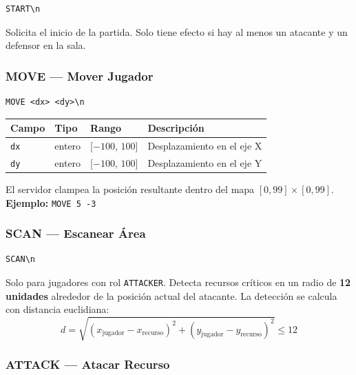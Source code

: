 \documentclass[12pt, letterpaper]{article}
\begin{document}
\begin{lstlisting}
START\n
\end{lstlisting}

Solicita el inicio de la partida. Solo tiene efecto si hay al menos un atacante y un defensor en la sala.

\subsubsection{MOVE --- Mover Jugador}

\begin{lstlisting}
MOVE <dx> <dy>\n
\end{lstlisting}

\begin{table}[H]
\centering
\begin{tabularx}{\textwidth}{l l l X}
\toprule
\textbf{Campo} & \textbf{Tipo} & \textbf{Rango} & \textbf{Descripción} \\
\midrule
\texttt{dx} & entero & {[}$-100$, $100${]} & Desplazamiento en el eje X \\
\texttt{dy} & entero & {[}$-100$, $100${]} & Desplazamiento en el eje Y \\
\bottomrule
\end{tabularx}
\end{table}

El servidor clampea la posición resultante dentro del mapa $[0, 99] \times [0, 99]$. \\
\textbf{Ejemplo:} \texttt{MOVE 5 -3}

\subsubsection{SCAN --- Escanear Área}

\begin{lstlisting}
SCAN\n
\end{lstlisting}

Solo para jugadores con rol \texttt{ATTACKER}. Detecta recursos críticos en un radio de \textbf{12 unidades} alrededor de la posición actual del atacante. La detección se calcula con distancia euclidiana:
\[
    d = \sqrt{(x_\text{jugador} - x_\text{recurso})^2 + (y_\text{jugador} - y_\text{recurso})^2} \leq 12
\]

\subsubsection{ATTACK --- Atacar Recurso}
\end{document}
